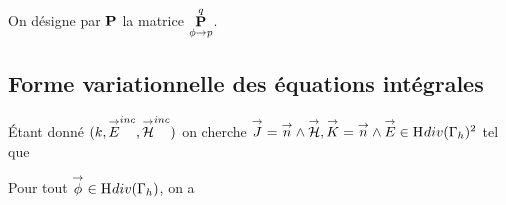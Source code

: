 


    \begin{defn}
      On désigne par \(\mPP\) la matrice \(\mP{\phi}{p}{q}\).
    \end{defn}




  

  \subsection{Forme variationnelle des équations intégrales}
    Étant donné \((k,\vE^{inc},\vH^{inc})\) on cherche \(\vJ = \vn \pvect \vH, \vK = \vn \pvect \vE \in \Hdiv(\Gamma_h)^2\)  tel que

    Pour tout \(\vect{\phi} \in \Hdiv(\Gamma_h)\), on a

